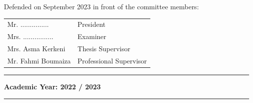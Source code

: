 \begin{titlepage}
\begin{center}
    
        \vspace{0.5cm}

        \small Defended on September 2023 in front of the committee members:

        \renewcommand\arraystretch{1}
        \begin{tabular}{m{} m{}}
            Mr. ............... & President \\
            Mrs. ................ & Examiner \\
            Mrs. Asma Kerkeni & Thesis Supervisor \\
            Mr. Fahmi Boumaiza & Professional Supervisor
        \end{tabular}
    \end{center}

    \vfill
    \centering
    \rule{40px}{0.5px} \space \footnotesize \textbf{Academic Year: 2022 / 2023} \space \rule{40px}{0.5px}  
\end{titlepage}
\cleardoublepage